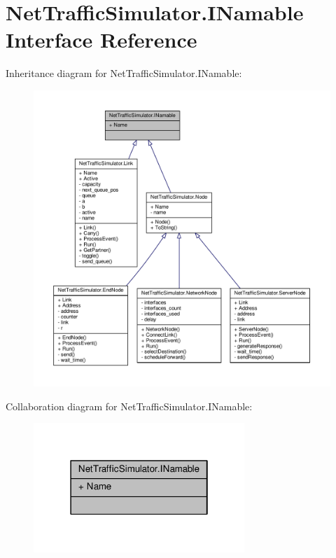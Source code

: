\hypertarget{interfaceNetTrafficSimulator_1_1INamable}{\section{Net\-Traffic\-Simulator.\-I\-Namable Interface Reference}
\label{interfaceNetTrafficSimulator_1_1INamable}
}


Inheritance diagram for Net\-Traffic\-Simulator.\-I\-Namable\-:\nopagebreak
\begin{figure}[H]
\begin{center}
\leavevmode
\includegraphics[width=350pt]{interfaceNetTrafficSimulator_1_1INamable__inherit__graph}
\end{center}
\end{figure}


Collaboration diagram for Net\-Traffic\-Simulator.\-I\-Namable\-:\nopagebreak
\begin{figure}[H]
\begin{center}
\leavevmode
\includegraphics[width=226pt]{interfaceNetTrafficSimulator_1_1INamable__coll__graph}
\end{center}
\end{figure}
